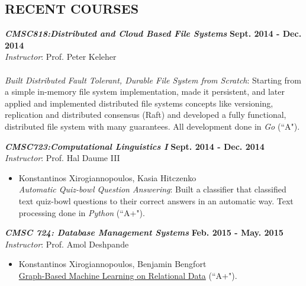 \documentclass[margin, 10pt]{res} %
\begin{document}
\begin{resume}

\section{RECENT COURSES}

{\sl \textbf{CMSC818:Distributed and Cloud Based File Systems}} \hfill \textbf{Sept. 2014 - Dec. 2014}\\
\textit{Instructor}: Prof. Peter Keleher\\
\\
\textit{Built Distributed Fault Tolerant, Durable File System from Scratch}: Starting from a simple in-memory file system implementation, made it persistent, and later applied and implemented distributed file systems concepts like versioning, replication and distributed consensus (Raft) and developed a fully functional, distributed file system with many guarantees. All development done in \textit{Go} (``A").

{\sl \textbf{CMSC723:Computational Linguistics I}} \hfill \textbf{Sept. 2014 - Dec. 2014}\\
\textit{Instructor}: Prof. Hal Daume III\\
\begin{itemize}
  \item
  Konstantinos Xirogiannopoulos, Kasia Hitczenko\\
  \textit{Automatic Quiz-bowl Question Answering}: Built a classifier that classified text quiz-bowl questions to their correct answers in an automatic way. Text processing done in \textit{Python} (``A+").
\end{itemize}


{\sl \textbf{CMSC 724: Database Management Systems}} \hfill \textbf{Feb. 2015 - May. 2015}\\
\textit{Instructor}: Prof. Amol Deshpande\\
\begin{itemize}
  \item Konstantinos Xirogiannopoulos, Benjamin Bengfort\\
  \href{https://drive.google.com/open?id=0B20MIwp_I7FlUGhyVmFYcjFuYmM}{Graph-Based Machine Learning on Relational Data} (``A+").
\end{itemize}


\end{resume}
\end{document}
